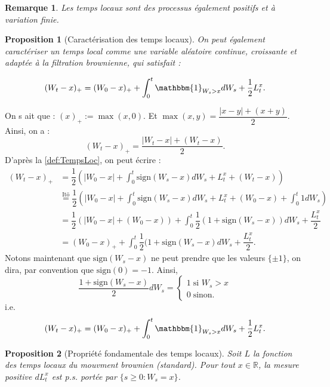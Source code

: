 \documentclass[openany]{book}
\makeatletter
\newcommand{\R}{\mathbb{R}}
\newcommand{\1}{\mathbbm{1}}
\newcommand{\sign}{\text{sign}}
\renewenvironment{proof}[1][\textbf{\textit{Démonstration}}]{%
  \par\pushQED{\qed}%
  \normalfont\topsep6\p@\@plus6\p@\relax
  \trivlist\item[\hskip\labelsep
    #1\@addpunct{.}]\ignorespaces
}{%
  \popQED\endtrivlist\@endpefalse
}
\theoremstyle{thmfont}
\theoremstyle{deffont}
\theoremstyle{thmfont}
\newtheorem{prop}[prop]{Proposition}
\theoremstyle{deffont}
\newtheorem*{remark}{Remarque}
\makeatother
\begin{document}
\begin{remark}
  Les temps locaux sont des processus également \textit{positifs} et à \textit{variation finie}.
\end{remark}

\begin{prop}[Caractérisation des temps locaux]
  On peut également caractériser un \textit{temps local} comme une variable aléatoire continue, croissante et adaptée à la filtration brownienne, qui satisfait :

  \begin{equation}
    (W_t - x)_+ = (W_0 - x)_+ + \int_0^t \1_{W_s > x}dW_s + \dfrac{1}{2}L_t^x.
  \end{equation}
\end{prop}

\begin{proof}
  On s
  ait que : $(x)_+ := \max(x, 0)$. Et $\max(x,y) = \dfrac{|x-y| + (x+y)}{2}$.
  Ainsi, on a : $$(W_t - x)_+ = \dfrac{|W_t - x| + (W_t - x)}{2}.$$
  D'après la \autoref{def:TempsLoc}, on peut écrire :
  \begin{align*}
    (W_t - x)_+ &= \dfrac{1}{2}\left(|W_0 - x| + \int_0^t\sign(W_s - x)dW_s + L_t^x + (W_t - x)\right)\\
    &\overset{\text{Itō}}{=} \dfrac{1}{2} \left(|W_0 - x| + \int_0^t\sign(W_s - x)dW_s + L_t^x + (W_0 - x) + \int_0^t 1 dW_s \right)\\
    &= \dfrac{1}{2} \left(|W_0 - x| + (W_0 - x) \right) + \int_0^t\dfrac{1}{2}(1 + \sign(W_s - x))dW_s + \dfrac{L_t^x}{2}\\
    &= (W_0 - x)_+ + \int_0^t\dfrac{1}{2}(1 + \sign(W_s - x) dW_s + \dfrac{L_t^x}{2}.
  \end{align*}
  Notons maintenant que $\sign(W_s - x)$ ne peut prendre que les valeurs $\{\pm 1\}$, on dira, par convention que $\sign(0) = -1$. Ainsi,
  $$ \dfrac{1 + \sign(W_s - x)}{2}dW_s =
  \begin{cases} 1\; \text{si } W_s > x\\
                0 \; \text{sinon.}
  \end{cases}
  $$
 i.e.
 $$(W_t - x)_+ = (W_0 - x)_+ + \int_0^t\1_{W_s > x} dW_s + \frac{1}{2}L_t^x.$$
  
\end{proof}

\begin{prop}[Propriété fondamentale des temps locaux]
Soit $L$ la fonction des temps locaux du mouvment brownien (standard). Pour tout $x \in \R$, la mesure positive $dL^x_t$ est p.s. portée par $\{s \geq 0 : W_s = x\}$.  
\end{prop}
\end{document}
